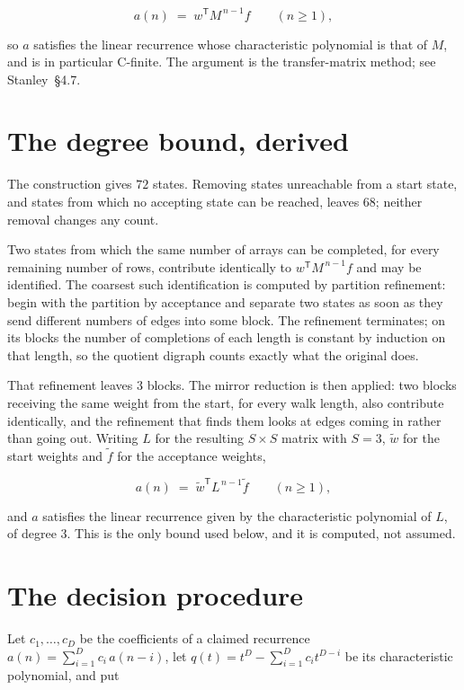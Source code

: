 \documentclass[11pt]{article}
\theoremstyle{definition}
\begin{document}
\[a(n) \;=\; w^{\mathsf T} M^{\,n-1} f \qquad (n \ge 1),\]

so $a$ satisfies the linear recurrence whose characteristic polynomial is that of $M$, and is in particular C-finite. The argument is the transfer-matrix method; see Stanley~\S4.7.

\section{The degree bound, derived}

The construction gives $72$ states. Removing states unreachable from a start state, and states from which no accepting state can be reached, leaves $68$; neither removal changes any count.

Two states from which the same number of arrays can be completed, for every remaining number of rows, contribute identically to $w^{\mathsf T}M^{\,n-1}f$ and may be identified. The coarsest such identification is computed by partition refinement: begin with the partition by acceptance and separate two states as soon as they send different numbers of edges into some block. The refinement terminates; on its blocks the number of completions of each length is constant by induction on that length, so the quotient digraph counts exactly what the original does.

That refinement leaves $3$ blocks. The mirror reduction is then applied: two blocks receiving the same weight from the start, for every walk length, also contribute identically, and the refinement that finds them looks at edges coming in rather than going out. Writing $L$ for the resulting $S \times S$ matrix with $S = 3$, $\tilde w$ for the start weights and $\tilde f$ for the acceptance weights,

\[a(n) \;=\; \tilde w^{\mathsf T} L^{\,n-1} \tilde f \qquad (n \ge 1),\]

and $a$ satisfies the linear recurrence given by the characteristic polynomial of $L$, of degree $3$. This is the only bound used below, and it is computed, not assumed.

\section{The decision procedure}

Let $c_1,\dots,c_D$ be the coefficients of a claimed recurrence $a(n) = \sum_{i=1}^{D} c_i\,a(n-i)$, let $q(t) = t^{D} - \sum_{i=1}^{D} c_i t^{D-i}$ be its characteristic polynomial, and put
\end{document}
